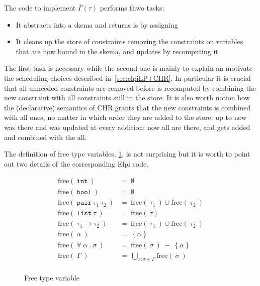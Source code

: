 \documentclass[a4paper, 11pt]{book}
\begin{document}
\noindent
The code to implement $\overline{\Gamma}(\tau)$ performs thwo tasks:

\begin{itemize}
  \item It abstracts  into a skema  and
    returns is by assigning 
  \item It cleans up the store of constraints removing the 
    constraints on variables that are now bound in the skema, and updates
     by recomputing it
\end{itemize}

The first task is necessary while the second one is mainly to explain an motivate
the scheduling choices described in~\cref{sec:elpiLP+CHR}. In particular it is crucial
that all unneeded  constraints are removed before
 is recomputed by combining the new constraint with all
 constraints still in the store. It is also worth notion how
the (declarative) semantics of CHR grants that the new 
constraints is combined with all  ones, no matter in
which order they are added to the store: up to now  was
there and was updated at every  addition; now all
 are there, and  gets added and combined
with the all.

The definition of free type variables, \cref{img:free}, is not
surprising but it is worth to point out two details of the corresponding Elpi code.

\begin{figure}
$$
\begin{array}{ll}
  \text{free}(\ \mathtt{int}\ ) &=\ \emptyset\\
  \text{free}(\ \mathtt{bool}\ ) &=\ \emptyset\\
  \text{free}(\ \mathtt{pair}\ \tau_1\ \tau_2\ ) &=\ \text{free}(\ \tau_1\ )\cup \text{free}(\ \tau_2\ ) \\
  \text{free}(\ \mathtt{list}\ \tau\ ) &=\ \text{free}(\ \tau ) \\
  \text{free}(\ \tau_1 \to \tau_2\ ) &=\ \text{free}(\ \tau_1\ )\cup \text{free}(\ \tau_2\ ) \\
  \text{free}(\ \alpha\ ) &=\ \left\{\alpha\right\}\\
  \text{free}(\ \forall\ \alpha\ .\ \sigma\ ) &=\ \text{free}(\ \sigma\ )\  -\  \left\{\alpha\right\}\\
  \text{free}(\ \Gamma\ ) &=\ \bigcup\limits_{x:\sigma \in \Gamma}\text{free}(\ \sigma\ )\\
\end{array}
$$
\caption{Free type variable\label{img:free}}
\end{figure}
\end{document}
